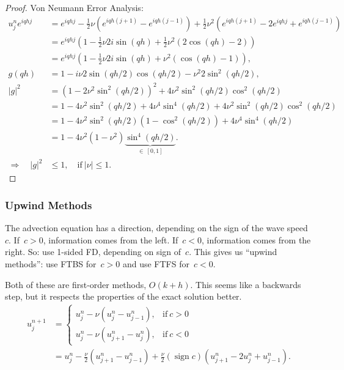 \documentclass[12pt, a4paper]{article}
\def\sign{\mathop{\mathrm{sign}}}
\theoremstyle{definition}
\theoremstyle{remark}
\numberwithin{equation}{section}
\begin{document}
\begin{proof}
Von Neumann Error Analysis:
\begin{align*}
u_j^n e^{iqhj} &= e^{iqhj} - \tfrac{1}{2}\nu(e^{iqh(j+1)} - e^{iqh(j-1)}) 
        + \tfrac{1}{2}\nu^2(e^{iqh(j+1)} - 2e^{iqhj} + e^{iqh(j-1)}) \\
    &= e^{iqhj} (1 - \tfrac{1}{2}\nu 2 i \sin(qh) + \tfrac{1}{2} \nu^2 (2\cos (qh) - 2)) \\
    &= e^{iqhj} (1 - \tfrac{1}{2}\nu 2 i \sin(qh) +  \nu^2 (\cos (qh) - 1)), \\
g(qh) &= 1 - i \nu 2 \sin(qh/2) \cos(qh/2) - \nu^2 2 \sin^2(qh/2), \\
|g|^2 &= (1 - 2\nu^2 \sin^2(qh/2))^2 + 4\nu^2\sin^2(qh/2)\cos^2(qh/2) \\
      &= 1 - 4\nu^2\sin^2(qh/2) + 4\nu^4\sin^4(qh/2) + 4\nu^2\sin^2(qh/2)\cos^2(qh/2) \\
      &= 1 - 4\nu^2\sin^2(qh/2)(1 - \cos^2(qh/2)) + 4\nu^4\sin^4(qh/2) \\
      &= 1 - 4\nu^2(1-\nu^2)\underbrace{\sin^4(qh/2)}_{\in\ [0,1]}. \\
\Longrightarrow \quad |g|^2 &\le 1, \quad \text{if}\ |\nu| \le 1.
\end{align*}
\end{proof}

\newpage
\subsubsection{Upwind Methods}

The advection equation has a direction, depending on the sign of the wave speed $c$.
If~$c>0$, information comes from the left. If~$c < 0$, information comes from the
right. So: use 1-sided FD, depending on sign of~$c$. This gives us ``upwind methods'':
use FTBS for~$c > 0$ and use FTFS for~$c < 0$.

Both of these are first-order methods, $O(k+h)$. This seems like a backwards step,
but it respects the properties of the exact solution better.
\begin{align*}
u_j^{n+1} &= \left\{ \begin{array}{ll} 
    u_j^n - \nu(u_j^n - u_{j-1}^{n}), & \text{if}\ c > 0 \\
    u_j^n - \nu(u_{j+1}^n - u_j^n), & \text{if}\ c < 0
\end{array} \right. \\
&= u_j^n - \tfrac{\nu}{2}(u_{j+1}^n - u_{j-1}^n) + \tfrac{\nu}{2} (\sign c)(u_{j+1}^n - 2u_j^n + u_{j-1}^n).
\end{align*}
\end{document}
